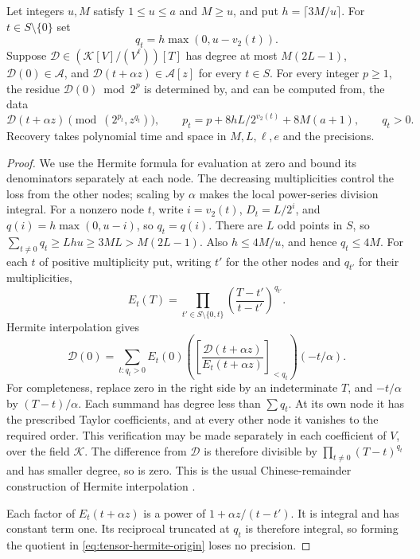 \begin{lemma}\label{lem:decreasing-hermite-multiplicities}
Let integers $u,M$ satisfy $1\le u\le a$ and $M\ge u$, and put
$h=\lceil3M/u\rceil$.
For $t\in S\setminus\{0\}$ set
\[
 q_t=h\max(0,u-v_2(t)).
\]
Suppose $\mathcal D\in(\mathcal K[V]/(V^\ell))[T]$ has degree at most
$M(2L-1)$, $\mathcal D(0)\in\mathcal A$, and
$\mathcal D(t+\alpha z)\in\mathcal A[z]$ for every $t\in S$.
For every integer $p\ge1$, the residue $\mathcal D(0)\bmod2^p$ is
determined by, and can be computed from, the data
\[
 \mathcal D(t+\alpha z)\pmod{(2^{p_t},z^{q_t})},
 \qquad
 p_t=p+8hL/2^{v_2(t)}+8M(a+1),\qquad q_t>0.
\]
Recovery takes polynomial time and space in $M,L,\ell,e$ and the
precisions.
\end{lemma}
\begin{proof}
We use the Hermite formula for evaluation at zero and bound its
denominators separately at each node. The decreasing multiplicities
control the loss from the other nodes; scaling by $\alpha$ makes
the local power-series division integral.
For a nonzero node $t$, write $i=v_2(t)$, $D_t=L/2^i$, and
$q(i)=h\max(0,u-i)$, so $q_t=q(i)$.
There are $L$ odd points in $S$, so
$\sum_{t\ne0}q_t\ge Lhu\ge3ML>M(2L-1)$.  Also
$h\le4M/u$, and hence $q_t\le4M$.
For each $t$ of positive multiplicity put, writing $t'$ for the other
nodes and $q_{t'}$ for their multiplicities,
\[
 E_t(T)=\prod_{t'\in S\setminus\{0,t\}}
                    \left(\frac{T-t'}{t-t'}\right)^{q_{t'}}.
\]
Hermite interpolation gives
\begin{equation}\label{eq:tensor-hermite-origin}
 \mathcal D(0)=\sum_{t:q_t>0}E_t(0)
       \left(\left[\frac{\mathcal D(t+\alpha z)}
                            {E_t(t+\alpha z)}\right]_{<q_t}\right)
                            (-t/\alpha).
\end{equation}
For completeness, replace zero in the right side by an indeterminate
$T$, and $-t/\alpha$ by $(T-t)/\alpha$.  Each summand has degree
less than $\sum q_t$.  At its own node it has the prescribed Taylor coefficients,
and at every other node it vanishes to the required order.
This verification may be made separately in each coefficient of
$V$, over the field $\mathcal K$. The difference from $\mathcal D$ is therefore divisible by
$\prod_{t\ne0}(T-t)^{q_t}$ and has smaller degree, so is zero.
This is the usual Chinese-remainder construction of Hermite
interpolation \cite[Section~5.6]{vzGG13}.

Each factor of $E_t(t+\alpha z)$ is a power of
$1+\alpha z/(t-t')$.  It is integral and has constant term one.
Its reciprocal truncated at $q_t$ is therefore integral, so
forming the quotient in \eqref{eq:tensor-hermite-origin} loses no
precision.


\end{proof}
